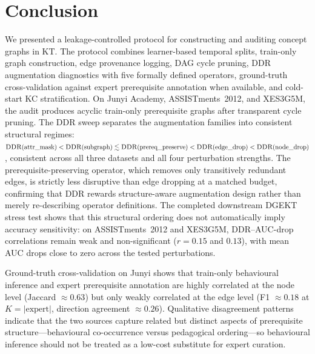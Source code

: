 \documentclass[runningheads]{llncs}
\newcommand{\DDR}{\textsc{DDR}}
\begin{document}
\section{Conclusion}
\label{sec:concl}
We presented a leakage-controlled protocol for constructing and auditing
concept graphs in KT. The protocol combines learner-based temporal
splits, train-only graph construction, edge provenance logging, DAG
cycle pruning, \DDR{} augmentation diagnostics with five formally
defined operators, ground-truth cross-validation against expert
prerequisite annotation when available, and cold-start KC
stratification. On Junyi Academy, ASSISTments~2012, and XES3G5M, the
audit produces acyclic train-only prerequisite graphs after transparent
cycle pruning. The \DDR{} sweep separates the augmentation
families into consistent structural regimes:
$\DDR(\text{attr\_mask}) < \DDR(\text{subgraph}) \lesssim
\DDR(\text{prereq\_preserve}) < \DDR(\text{edge\_drop}) <
\DDR(\text{node\_drop})$,
consistent across all three datasets and all four perturbation
strengths. The prerequisite-preserving operator, which removes only
transitively redundant edges, is strictly less disruptive than edge
dropping at a matched budget, confirming that \DDR{} rewards
structure-aware augmentation design rather than merely re-describing
operator definitions. The completed downstream DGEKT stress test shows
that this structural ordering does not automatically imply accuracy
sensitivity: on ASSISTments~2012 and XES3G5M, \DDR{}--AUC-drop
correlations remain weak and non-significant ($r{=}0.15$ and $0.13$),
with mean AUC drops close to zero across the tested perturbations.

Ground-truth cross-validation on Junyi shows that train-only
behavioural inference and expert prerequisite annotation are highly
correlated at the node level (Jaccard $\approx 0.63$) but only weakly
correlated at the edge level (F1 $\approx 0.18$ at $K=|\text{expert}|$,
direction agreement $\approx 0.26$). Qualitative disagreement patterns
indicate that the two sources capture related but distinct aspects of
prerequisite structure---behavioural co-occurrence versus pedagogical
ordering---so behavioural inference should not be treated as a
low-cost substitute for expert curation.
\end{document}
